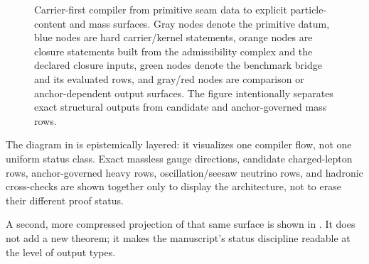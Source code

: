 \documentclass[11pt,a4paper]{article}
\theoremstyle{definition}
\theoremstyle{remark}
\begin{document}
\begin{figure}[p]
\caption{Carrier-first compiler from primitive seam data to explicit particle-content and mass surfaces. Gray nodes denote the primitive datum, blue nodes are hard carrier/kernel statements, orange nodes are closure statements built from the admissibility complex and the declared closure inputs, green nodes denote the benchmark bridge and its evaluated rows, and gray/red nodes are comparison or anchor-dependent output surfaces. The figure intentionally separates exact structural outputs from candidate and anchor-governed mass rows.}
\label{fig:compiler-to-masses}
\end{figure}

The diagram in  is epistemically layered: it visualizes one compiler flow, not one uniform status class. Exact massless gauge directions, candidate charged-lepton rows, anchor-governed heavy rows, oscillation/seesaw neutrino rows, and hadronic cross-checks are shown together only to display the architecture, not to erase their different proof status.

A second, more compressed projection of that same surface is shown in . It does not add a new theorem; it makes the manuscript's status discipline readable at the level of output types.
\end{document}
